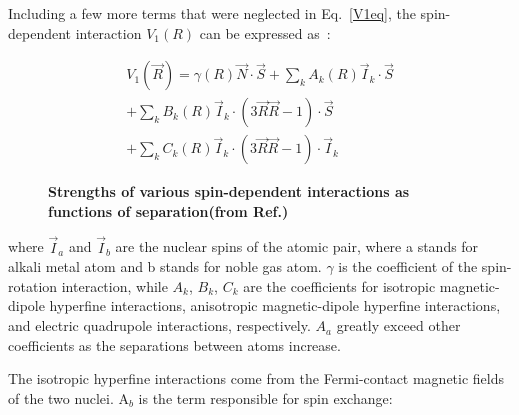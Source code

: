 Including a few more terms that were neglected in Eq.~\ref{V1eq}, the spin-dependent interaction $V_{1}(R)$ can be expressed as~\cite{WalkerHapper}:

\begin{equation}
\begin{split}
V_{1}(\vec{R})=\gamma(R)\vec{N}\cdot \vec{S}+\sum_{k}A_{k}(R)\vec{I}_{k}\cdot \vec{S}\\
+\sum_{k}B_{k}(R)\vec{I}_{k}\cdot (3\vec{R}\vec{R}-1)\cdot \vec{S}\\
+\sum_{k}C_{k}(R)\vec{I}_{k}\cdot (3\vec{R}\vec{R}-1)\cdot \vec{I}_{k}
\end{split}
\end{equation}

\begin{figure}[H]
	\centering
	\caption{{\bf Strengths of various spin-dependent interactions as functions of separation(from Ref.\@ \cite{WalkerHapper})}}
	\label{V1}
\end{figure}
where $\vec{I}_{a}$ and $\vec{I}_{b}$ are the nuclear spins of the atomic pair, where a stands for alkali metal atom and b stands for noble gas atom. $\gamma$ is the coefficient of the spin-rotation interaction, while $A_{k}$, $B_{k}$, $C_{k}$ are the coefficients for isotropic magnetic-dipole hyperfine interactions, anisotropic magnetic-dipole hyperfine interactions, and electric quadrupole interactions, respectively. $A_{a}$ greatly exceed other coefficients as the separations between atoms increase. 

The isotropic hyperfine interactions come from the Fermi-contact magnetic fields of the two nuclei. A$_{b}$ is the term responsible for spin exchange:

